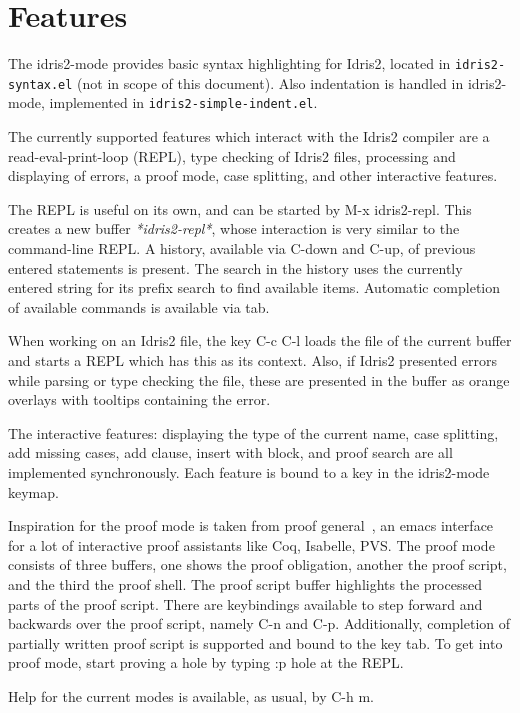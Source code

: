 \documentclass{article}
\begin{document}
\section{Features}
The idris2-mode provides basic syntax highlighting for Idris2, located in \texttt{idris2-syntax.el} (not in scope of this document).
Also indentation is handled in idris2-mode, implemented in \texttt{idris2-simple-indent.el}.

The currently supported features which interact with the Idris2 compiler are a read-eval-print-loop (REPL), type checking of Idris2 files, processing and displaying of errors, a proof mode, case splitting, and other interactive features.

The REPL is useful on its own, and can be started by \textsf{M-x idris2-repl}.
This creates a new buffer \emph{*idris2-repl*}, whose interaction is very similar to the command-line REPL.
A history, available via C-down and C-up, of previous entered statements is present.
The search in the history uses the currently entered string for its prefix search to find available items.
Automatic completion of available commands is available via tab.

When working on an Idris2 file, the key C-c C-l loads the file of the current buffer and starts a REPL which has this as its context.
Also, if Idris2 presented errors while parsing or type checking the file, these are presented in the buffer as orange overlays with tooltips containing the error.

The interactive features: displaying the type of the current name, case splitting, add missing cases, add clause, insert with block, and proof search are all implemented synchronously.
Each feature is bound to a key in the idris2-mode keymap.

Inspiration for the proof mode is taken from proof general~\cite{proofgeneral}, an emacs interface for a lot of interactive proof assistants like Coq, Isabelle, PVS.
The proof mode consists of three buffers, one shows the proof obligation, another the proof script, and the third the proof shell.
The proof script buffer highlights the processed parts of the proof script.
There are keybindings available to step forward and backwards over the proof script, namely C-n and C-p.
Additionally, completion of partially written proof script is supported and bound to the key tab.
To get into proof mode, start proving a hole by typing \textsf{:p hole} at the REPL.

Help for the current modes is available, as usual, by C-h m.
\end{document}
